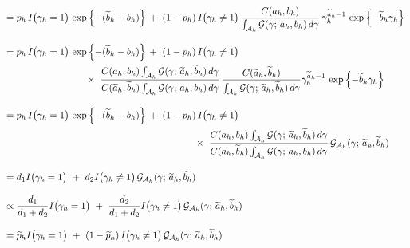\documentclass[11pt]{article}
\newcommand{\ind}{I}
\begin{document}
\begin{enumerate}[label=Step \arabic*., leftmargin=13mm, itemsep=10mm]
\begin{align*}
&= p_h\, \ind\big( \gamma_h = 1 \big)\, \exp\left\{ -(\widetilde{b}_h - b_h) \right\} \,+~ (1 - p_h)\, \ind\big( \gamma_h \ne 1 \big)\, \frac{ C(a_h,b_h) }{ \int_{\mathcal{A}_h} \mathcal{G}(\gamma;\, a_h,b_h)\, d\gamma }\, \gamma_h^{ \widetilde{a}_h - 1 }\, \exp\left\{ -\widetilde{b}_h \gamma_h \right\} \\[2ex]
&= p_h\, \ind\big( \gamma_h = 1 \big)\, \exp\left\{ -(\widetilde{b}_h - b_h) \right\} \,+~ (1 - p_h)\, \ind\big( \gamma_h \ne 1 \big) \\
& \hspace{30mm} \times~ \frac{ C(a_h,b_h) \int_{\mathcal{A}_h} \mathcal{G}(\gamma;\, \widetilde{a}_h, \widetilde{b}_h)\, d\gamma }{ C(\widetilde{a}_h, \widetilde{b}_h) \int_{\mathcal{A}_h} \mathcal{G}(\gamma;\, a_h, b_h)\, d\gamma }\, \frac{ C( \widetilde{a}_h, \widetilde{b}_h) }{ \int_{\mathcal{A}_h} \mathcal{G}(\gamma;\, \widetilde{a}_h, \widetilde{b}_h)\, d\gamma } \gamma_h^{ \widetilde{a}_h - 1 }\, \exp\left\{ -\widetilde{b}_h \gamma_h \right\} \\[2ex]
&= p_h\, \ind\big( \gamma_h = 1 \big)\, \exp\left\{ -(\widetilde{b}_h - b_h) \right\} \,+~ (1 - p_h)\, \ind\big( \gamma_h \ne 1 \big)\, \\
& \hspace{70mm} \times~ \frac{ C(a_h,b_h) \int_{\mathcal{A}_h} \mathcal{G}(\gamma;\, \widetilde{a}_h, \widetilde{b}_h)\, d\gamma }{ C(\widetilde{a}_h, \widetilde{b}_h) \int_{\mathcal{A}_h} \mathcal{G}(\gamma;\, a_h, b_h)\, d\gamma }\, \mathcal{G}_{\mathcal{A}_h} (\gamma;\, \widetilde{a}_h, \widetilde{b}_h) \\[2ex]
&= d_1 \ind\big( \gamma_h = 1 \big) ~+~ d_2 \ind\big( \gamma_h \ne 1 \big)\, \mathcal{G}_{\mathcal{A}_h} (\gamma;\, \widetilde{a}_h, \widetilde{b}_h) \\[2ex]
&\propto \frac{ d_1 }{ d_1 + d_2 } \ind\big( \gamma_h = 1 \big) ~+~ \frac{ d_2 }{ d_1 + d_2 } \ind\big( \gamma_h \ne 1 \big)\, \mathcal{G}_{\mathcal{A}_h} (\gamma;\, \widetilde{a}_h, \widetilde{b}_h) \\[2ex]
&= \widetilde{p}_h \ind\big( \gamma_h = 1 \big) ~+~ (1 - \widetilde{p}_h)\, \ind\big( \gamma_h \ne 1 \big)\, \mathcal{G}_{\mathcal{A}_h} (\gamma;\, \widetilde{a}_h, \widetilde{b}_h) \\
\end{align*}







\end{enumerate}
\end{document}
